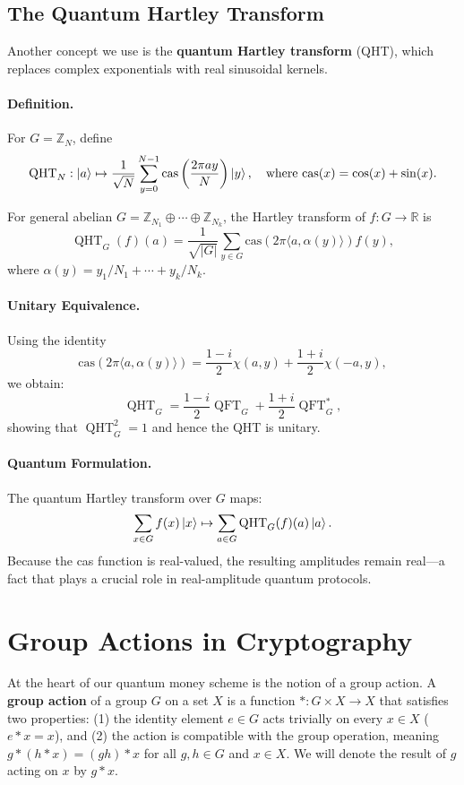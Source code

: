 \documentclass[12pt]{report}
\newcommand{\cas}{\mathrm{cas}}
\begin{document}
\subsection{The Quantum Hartley Transform}

Another concept we use is the \textbf{quantum Hartley transform} (QHT), which replaces complex exponentials with real sinusoidal kernels.

\paragraph{Definition.}
For $G = \mathbb{Z}_N$, define
\[
\operatorname{QHT}_N: \ket{a} \mapsto \frac{1}{\sqrt{N}} \sum_{y = 0}^{N - 1} \cas\left(\frac{2\pi a y}{N}\right) \ket{y}, \quad \text{where } \cas(x) = \cos(x) + \sin(x).
\]

For general abelian $G = \mathbb{Z}_{N_1} \oplus \cdots \oplus \mathbb{Z}_{N_k}$, the Hartley transform of $f : G \to \mathbb{R}$ is
\begin{equation}
    \operatorname{QHT}_G(f)({a}) = \frac{1}{\sqrt{|G|}} \sum_{{y} \in G} \cas(2\pi \langle {a}, \alpha({y}) \rangle) f({y}),
\end{equation}
where $\alpha({y}) = y_1 / N_1 + \cdots + y_k / N_k$.

\paragraph{Unitary Equivalence.}
Using the identity
\[
\cas(2\pi \langle {a}, \alpha({y}) \rangle) = \frac{1 - i}{2}\chi({a}, {y}) + \frac{1 + i}{2}\chi(-{a}, {y}),
\]
we obtain:
\begin{equation}
\operatorname{QHT}_G = \frac{1 - i}{2} \operatorname{QFT}_G + \frac{1 + i}{2} \operatorname{QFT}_G^*, \label{eq:QHT_QFT}
\end{equation}
showing that $\operatorname{QHT}_G^2 = {1}$ and hence the QHT is unitary.

\paragraph{Quantum Formulation.}
The quantum Hartley transform over $G$ maps:
\[
\sum_{{x} \in G} f({x}) \ket{{x}} \mapsto \sum_{{a} \in G} \operatorname{QHT}_G(f)({a}) \ket{{a}}.
\]
Because the cas function is real-valued, the resulting amplitudes remain real—a fact that plays a crucial role in real-amplitude quantum protocols.


\section{Group Actions in Cryptography}
At the heart of our quantum money scheme is the notion of a group action. A \textbf{group action} of a group $G$ on a set $X$ is a function $*\colon G \times X \to X$ that satisfies two properties: (1) the identity element $e \in G$ acts trivially on every $x \in X$ ($e * x = x$), and (2) the action is compatible with the group operation, meaning $g*(h* x) = (gh)*x$ for all $g,h \in G$ and $x \in X$. We will denote the result of $g$ acting on $x$ by $g*x$.
\end{document}
